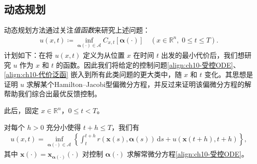 \documentclass[../../main.tex]{subfiles}
\begin{document}
\subsection{动态规划}\label{subsection:ch10-动态规划}

动态规划方法通过关注\emph{值函数}来研究上述问题：
\begin{align}
u(x,t)\coloneqq \inf_{\boldsymbol{\alpha}(\cdot)\in\mathcal{A}} C_{x,t}[\boldsymbol{\alpha}(\cdot)] \quad (x\in\mathbb{R}^n,\;0\leqslant t\leqslant T).
\label{align:ch10-值函数}
\end{align}
计划如下：在将 $u(x,t)$ 定义为从位置 $x$ 在时间 $t$ 出发的最小代价后，我们想研究 $u$ 作为 $x$ 和 $t$ 的函数。因此我们将给定的控制问题\eqref{align:ch10-受控ODE}、\eqref{align:ch10-代价泛函} 嵌入到所有此类问题的更大类中，随 $x$ 和 $t$ 变化。其思想是证明 $u$ 求解某个Hamilton--Jacobi型偏微分方程，并反过来证明该偏微分方程的解帮助我们综合出最优反馈控制。

此后，固定 $x\in\mathbb{R}^n$，$0\leqslant t<T$。

\begin{theorem}[最优性条件。]\label{theorem:ch10-最优性条件}对每个 $h>0$ 充分小使得 $t+h\leqslant T$，我们有
\begin{align}
u(x,t)=\inf_{\boldsymbol{\alpha}(\cdot)\in\mathcal{A}}\left\{\int_t^{t+h}r(\mathbf{x}(s),\boldsymbol{\alpha}(s))\,\mathrm{d}s+u(\mathbf{x}(t+h),t+h)\right\},
\label{align:ch10-动态规划方程}
\end{align}
其中 $\mathbf{x}(\cdot)=\mathbf{x}_{\boldsymbol{\alpha}(\cdot)}(\cdot)$ 对控制 $\boldsymbol{\alpha}(\cdot)$ 求解常微分方程\eqref{align:ch10-受控ODE}。
\end{theorem}
\end{document}
